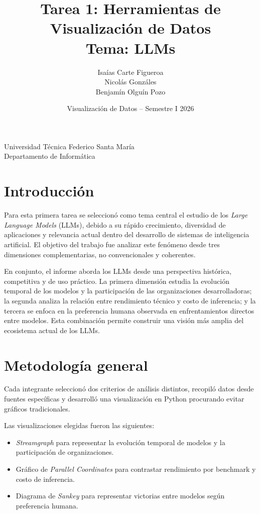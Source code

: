\documentclass[12pt,a4paper]{article}
\title{\textbf{Tarea 1: Herramientas de Visualización de Datos}\\
Tema: \textbf{LLMs}}
\author{
    Isaías Carte Figueroa \\
    Nicolás Gonzáles \\
    Benjamín Olguín Pozo
}
\date{Visualización de Datos -- Semestre I 2026}
\begin{document}
\maketitle
\thispagestyle{empty}

\begin{center}
Universidad Técnica Federico Santa María \\
Departamento de Informática
\end{center}

\vspace{1cm}

\section{Introducción}

Para esta primera tarea se seleccionó como tema central el estudio de los \textit{Large Language Models} (LLMs), debido a su rápido crecimiento, diversidad de aplicaciones y relevancia actual dentro del desarrollo de sistemas de inteligencia artificial. El objetivo del trabajo fue analizar este fenómeno desde tres dimensiones complementarias, no convencionales y coherentes.

En conjunto, el informe aborda los LLMs desde una perspectiva histórica, competitiva y de uso práctico. La primera dimensión estudia la evolución temporal de los modelos y la participación de las organizaciones desarrolladoras; la segunda analiza la relación entre rendimiento técnico y costo de inferencia; y la tercera se enfoca en la preferencia humana observada en enfrentamientos directos entre modelos. Esta combinación permite construir una visión más amplia del ecosistema actual de los LLMs.

\section{Metodología general}

Cada integrante seleccionó dos criterios de análisis distintos, recopiló datos desde fuentes específicas y desarrolló una visualización en Python procurando evitar gráficos tradicionales.

Las visualizaciones elegidas fueron las siguientes:

\begin{itemize}[leftmargin=1.2cm]
    \item \textit{Streamgraph} para representar la evolución temporal de modelos y la participación de organizaciones.
    \item Gráfico de \textit{Parallel Coordinates} para contrastar rendimiento por benchmark y costo de inferencia.
    \item Diagrama de \textit{Sankey} para representar victorias entre modelos según preferencia humana.
\end{itemize}
\end{document}
